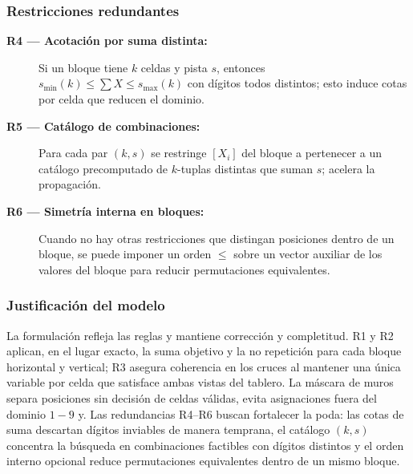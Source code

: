 \subsubsection*{Restricciones redundantes}
\begin{description}
  \item[\textbf{R4 — Acotación por suma distinta:}] Si un bloque tiene \(k\) celdas y pista \(s\), entonces \(s_{\min}(k)\le \sum X \le s_{\max}(k)\) con dígitos todos distintos; esto induce cotas por celda que reducen el dominio.
  \item[\textbf{R5 — Catálogo de combinaciones:}] Para cada par \((k,s)\) se restringe \([X_i]\) del bloque a pertenecer a un catálogo precomputado de \(k\)-tuplas distintas que suman \(s\); acelera la propagación.
  \item[\textbf{R6 — Simetría interna en bloques:}] Cuando no hay otras restricciones que distingan posiciones dentro de un bloque, se puede imponer un orden \(\le\) sobre un vector auxiliar de los valores del bloque para reducir permutaciones equivalentes.
\end{description}

\subsubsection*{Justificación del modelo}
La formulación refleja las reglas y mantiene corrección y completitud. R1 y R2 aplican, en el lugar exacto, la suma objetivo y la no repetición para cada bloque horizontal y vertical; R3 asegura coherencia en los cruces al mantener una única variable por celda que satisface ambas vistas del tablero. La máscara de muros separa posiciones sin decisión de celdas válidas, evita asignaciones fuera del dominio \(1\!-\!9\) y. Las redundancias R4–R6 buscan fortalecer la poda: las cotas de suma descartan dígitos inviables de manera temprana, el catálogo \((k,s)\) concentra la búsqueda en combinaciones factibles con dígitos distintos y el orden interno opcional reduce permutaciones equivalentes dentro de un mismo bloque.